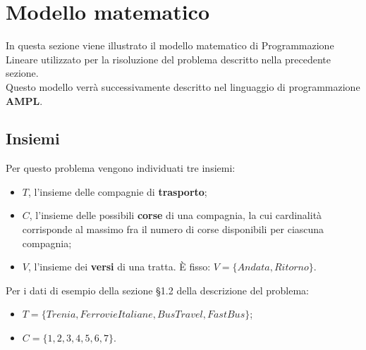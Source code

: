 \documentclass[main.tex]{subfiles}
\begin{document}
\section{Modello matematico}
In questa sezione viene illustrato il modello matematico di Programmazione Lineare utilizzato per la risoluzione del problema descritto nella precedente sezione.\\
Questo modello verrà successivamente descritto nel linguaggio di programmazione \textbf{AMPL}.

\subsection{Insiemi}
Per questo problema vengono individuati tre insiemi:
\begin{itemize}
    \item $T$, l'insieme delle compagnie di \textbf{trasporto};
    \item $C$, l'insieme delle possibili \textbf{corse} di una compagnia, la cui cardinalità corrisponde al massimo fra il numero di corse disponibili per ciascuna compagnia;
    \item $V$, l'insieme dei \textbf{versi} di una tratta. È fisso: $V = \{Andata, Ritorno\}$.
\end{itemize}
Per i dati di esempio della sezione §1.2 della descrizione del problema:
\begin{itemize}
    \item $T = \{Trenia, FerrovieItaliane, BusTravel, FastBus\}$;
    \item $C = \{1, 2, 3, 4, 5, 6, 7\}$.
\end{itemize}
\end{document}
